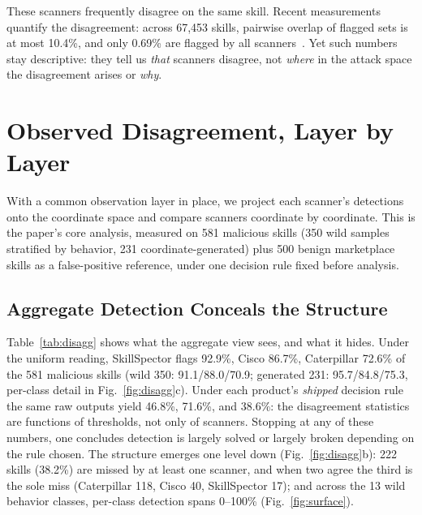 \documentclass[sigconf,nonacm]{acmart}
\begin{document}
These scanners frequently disagree on the same skill. Recent measurements quantify the disagreement: across 67{,}453 skills, pairwise overlap of flagged sets is at most 10.4\%, and only 0.69\% are flagged by all scanners~\cite{clawhub2026}. Yet such numbers stay descriptive: they tell us \emph{that} scanners disagree, not \emph{where} in the attack space the disagreement arises or \emph{why}.

\section{Observed Disagreement, Layer by Layer}
\label{sec:explain}

With a common observation layer in place, we project each scanner's detections onto the coordinate space and compare scanners coordinate by coordinate. This is the paper's core analysis, measured on 581 malicious skills (350 wild samples stratified by behavior, 231 coordinate-generated) plus 500 benign marketplace skills as a false-positive reference, under one decision rule fixed before analysis.

\subsection{Aggregate Detection Conceals the Structure}
Table~\ref{tab:disagg} shows what the aggregate view sees, and what it hides. Under the uniform reading, SkillSpector flags 92.9\%, Cisco 86.7\%, Caterpillar 72.6\% of the 581 malicious skills (wild 350: 91.1/88.0/70.9; generated 231: 95.7/84.8/75.3, per-class detail in Fig.~\ref{fig:disagg}c). Under each product's \emph{shipped} decision rule the same raw outputs yield 46.8\%, 71.6\%, and 38.6\%: the disagreement statistics are functions of thresholds, not only of scanners. Stopping at any of these numbers, one concludes detection is largely solved or largely broken depending on the rule chosen. The structure emerges one level down (Fig.~\ref{fig:disagg}b): 222 skills (38.2\%) are missed by at least one scanner, and when two agree the third is the sole miss (Caterpillar 118, Cisco 40, SkillSpector 17); and across the 13 wild behavior classes, per-class detection spans 0--100\% (Fig.~\ref{fig:surface}).
\end{document}
